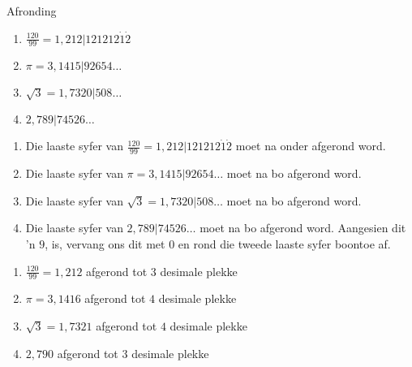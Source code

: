 \begin{wex}{Afronding}
{\begin{minipage}{\textwidth}
\vspace*{7pt}
\begin{enumerate}[itemsep=5pt, label=\textbf{\arabic*}. ] 
\item $\frac{120}{99}=1,212|121212\dot{1}\dot{2}$
\item $\pi =3,1415|92654\ldots$
\item $\sqrt{3}=1,7320|508\ldots$
\item $2,789|74526\ldots$
\end{enumerate}
\end{minipage}
\begin{minipage}{0.8\textwidth}
\vspace*{7pt}
\begin{enumerate}[itemsep=5pt, label=\textbf{\arabic*}. ]
\item Die laaste syfer van $\frac{120}{99}=1,212|121212\dot{1}\dot{2}$  moet na onder afgerond word.
\item Die laaste syfer van $\pi =3,1415|92654\ldots$ moet na bo afgerond word.
\item Die laaste syfer van $\sqrt{3}=1,7320|508\ldots$ moet na bo afgerond word.
\item Die laaste syfer van $2,789|74526\ldots$ moet na bo afgerond word.  
\newline Aangesien dit ’n $9$, is, vervang ons dit met $0$ en
rond die tweede laaste syfer boontoe af.
\end{enumerate}
\vspace*{7pt}
\end{minipage}
\begin{minipage}{\textwidth}
\vspace*{7pt}
\begin{enumerate}[itemsep=5pt, label=\textbf{\arabic*}. ]
\item $\frac{120}{99}=1,212$ afgerond tot $3$ desimale plekke
\item $\pi =3,1416$  afgerond tot $4$ desimale plekke
\item $\sqrt{3}=1,7321$ afgerond tot $4$ desimale plekke
\item $2,790$ afgerond tot $3$ desimale plekke
\end{enumerate}
\end{minipage}
}  
\end{wex}


